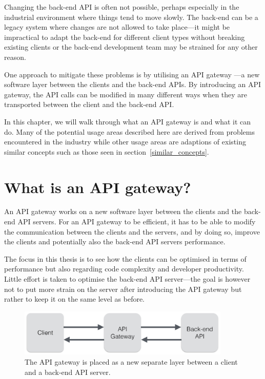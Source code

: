 \documentclass{cslthse-msc}
\begin{document}
Changing the back-end API is often not possible, perhaps especially in the industrial environment where things tend to move slowly. The back-end can be a legacy system where changes are not allowed to take place---it might be impractical to adapt the back-end for different client types without breaking existing clients or the back-end development team may be strained for any other reason.

One approach to mitigate these problems is by utilising an API gateway \cite{api_gateway}---a new software layer between the clients and the back-end APIs. By introducing an API gateway, the API calls can be modified in many different ways when they are transported between the client and the back-end API.

In this chapter, we will walk through what an API gateway is and what it can do. Many of the potential usage areas described here are derived from problems encountered in the industry while other usage areas are adaptions of existing similar concepts such as those seen in section~\ref{similar_concepts}.

\section{What is an API gateway?}
An API gateway works on a new software layer between the clients and the back-end API servers. For an API gateway to be efficient, it has to be able to modify the communication between the clients and the servers, and by doing so, improve the clients and potentially also the back-end API servers performance.

The focus in this thesis is to see how the clients can be optimised in terms of performance but also regarding code complexity and developer productivity. Little effort is taken to optimise the back-end API server---the goal is however not to put more strain on the server after introducing the API gateway but rather to keep it on the same level as before.

\begin{figure}[H]
  \centering
    \begin{center}
      \includegraphics[width=0.9\textwidth]{images/api_gateway.png}
    \end{center}
  \caption{The API gateway is placed as a new separate layer between a client and a back-end API server.}
\end{figure}
\end{document}
